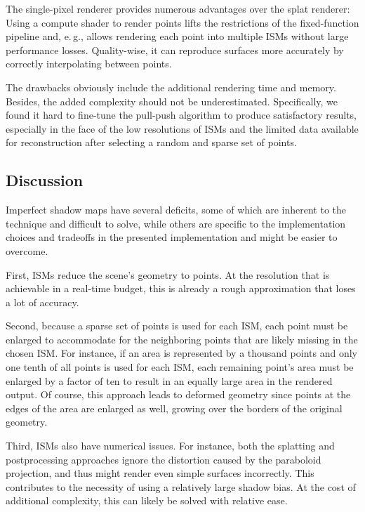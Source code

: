 The single-pixel renderer provides numerous advantages over the splat renderer: Using a compute shader to render points lifts the restrictions of the fixed-function pipeline and, e.\,g., allows rendering each point into multiple ISMs without large performance losses. Quality-wise, it can reproduce surfaces more accurately by correctly interpolating between points.

The drawbacks obviously include the additional rendering time and memory. Besides, the added complexity should not be underestimated. Specifically, we found it hard to fine-tune the pull-push algorithm to produce satisfactory results, especially in the face of the low resolutions of ISMs and the limited data available for reconstruction after selecting a random and sparse set of points.



\subsection{Discussion}
\label{sec:results:ism:discussion}

Imperfect shadow maps have several deficits, some of which are inherent to the technique and difficult to solve, while others are specific to the implementation choices and tradeoffs in the presented implementation and might be easier to overcome.

First, ISMs reduce the scene's geometry to points. At the resolution that is achievable in a real-time budget, this is already a rough approximation that loses a lot of accuracy.

Second, because a sparse set of points is used for each ISM, each point must be enlarged to accommodate for the neighboring points that are likely missing in the chosen ISM. For instance, if an area is represented by a thousand points and only one tenth of all points is used for each ISM, each remaining point's area must be enlarged by a factor of ten to result in an equally large area in the rendered output. Of course, this approach leads to deformed geometry since points at the edges of the area are enlarged as well, growing over the borders of the original geometry.

Third, ISMs also have numerical issues. For instance, both the splatting and postprocessing approaches ignore the distortion caused by the paraboloid projection, and thus might render even simple surfaces incorrectly. This contributes to the necessity of using a relatively large shadow bias. At the cost of additional complexity, this can likely be solved with relative ease.

